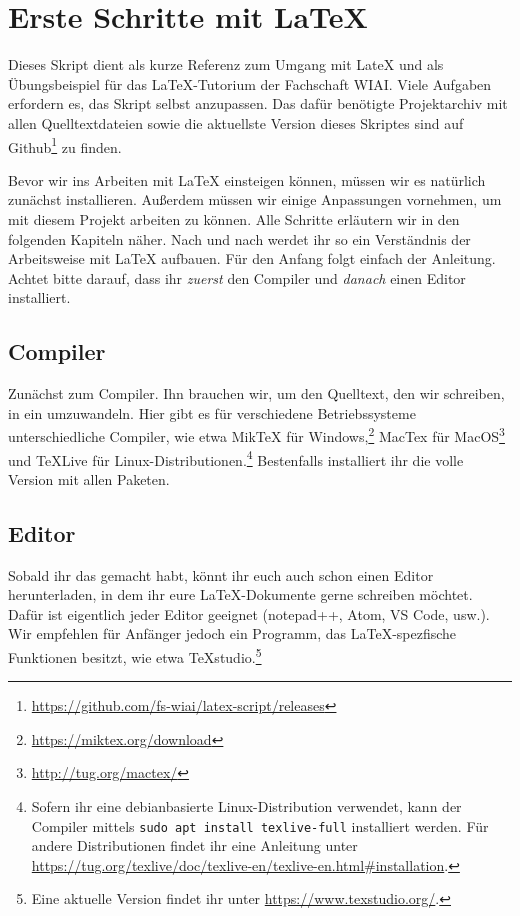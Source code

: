 \chapter*{Erste Schritte mit \LaTeX}

Dieses Skript dient als kurze Referenz zum Umgang mit LateX und als Übungsbeispiel für das LaTeX-Tutorium der Fachschaft WIAI.
Viele Aufgaben erfordern es, das Skript selbst anzupassen.
Das dafür benötigte Projektarchiv mit allen Quelltextdateien sowie die aktuellste Version dieses Skriptes sind auf Github\footnote{\url{https://github.com/fs-wiai/latex-script/releases}} zu finden. 

Bevor wir ins Arbeiten mit \LaTeX{} einsteigen können, müssen wir es natürlich zunächst installieren. 
Außerdem müssen wir einige Anpassungen vornehmen, um mit diesem Projekt arbeiten zu können.
Alle Schritte erläutern wir in den folgenden Kapiteln näher.
Nach und nach werdet ihr so ein Verständnis der Arbeitsweise mit \LaTeX{} aufbauen.
Für den Anfang folgt einfach der Anleitung.
Achtet bitte darauf, dass ihr \emph{zuerst} den Compiler und \emph{danach} einen Editor installiert.

\section*{Compiler}
Zunächst zum Compiler. Ihn brauchen wir, um den Quelltext, den wir schreiben, in ein  umzuwandeln. Hier gibt es für verschiedene Betriebssysteme unterschiedliche Compiler, wie etwa MikTeX für Windows,\footnote{\url{https://miktex.org/download}} MacTex für MacOS\footnote{\url{http://tug.org/mactex/}} und TeXLive für Linux-Distributionen.\footnote{Sofern ihr eine debianbasierte Linux-Distribution verwendet, kann der Compiler mittels \texttt{sudo apt install texlive-full} installiert werden. Für andere Distributionen findet ihr eine Anleitung unter \url{https://tug.org/texlive/doc/texlive-en/texlive-en.html\#installation}.} Bestenfalls installiert ihr die volle Version mit allen Paketen.

\section*{Editor}
Sobald ihr das gemacht habt, könnt ihr euch auch schon einen Editor 
herunterladen, in dem ihr eure \LaTeX-Dokumente gerne schreiben möchtet. Dafür 
ist eigentlich jeder Editor geeignet (notepad++, Atom, VS Code, usw.). Wir 
empfehlen für Anfänger jedoch ein Programm, das \LaTeX-spezfische Funktionen 
besitzt, wie etwa TeXstudio.\footnote{Eine aktuelle Version findet ihr unter 
\url{https://www.texstudio.org/}.}

